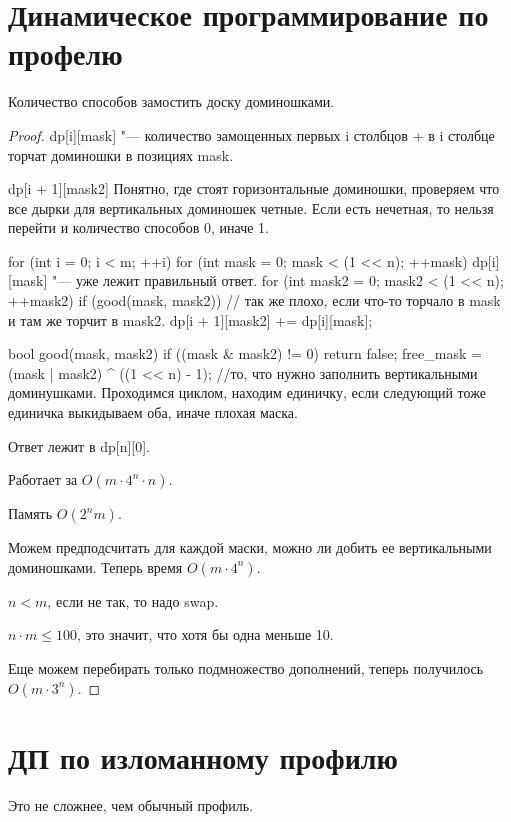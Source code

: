 \section{Динамическое программирование по профелю}
Количество способов замостить доску доминошками. 
\begin{proof}
dp[i][mask] "--- количество замощенных первых i столбцов + в i столбце торчат доминошки в позициях mask.

dp[i + 1][mask2] Понятно, где стоят горизонтальные доминошки, проверяем что все дырки для вертикальных доминошек четные. 
Если есть нечетная, то нельзя перейти и количество способов 0, иначе 1. 

\begin{cppcode}
for (int i = 0; i < m; ++i) {
    for (int mask = 0; mask < (1 << n); ++mask) {
        dp[i][mask] "--- уже лежит правильный ответ. 
        for (int mask2 = 0; mask2 < (1 << n); ++mask2) { 
            if (good(mask, mask2)) {// так же плохо, если что-то торчало в mask и там же торчит в mask2.
                dp[i + 1][mask2] += dp[i][mask];
            } 
        }
    }
}

bool good(mask, mask2) {
    if ((mask & mask2) != 0) return false;
    free_mask = (mask | mask2) ^ ((1 << n) - 1); //то, что нужно заполнить вертикальными доминушками.
    Проходимся циклом, находим единичку, если следующий тоже единичка выкидываем оба, иначе плохая маска.   
}
\end{cppcode}

Ответ лежит в dp[n][0].

Работает за $O(m \cdot 4^n \cdot n)$.

Память $O(2^n m)$.

Можем предподсчитать для каждой маски, можно ли добить ее вертикальными доминошками. 
Теперь время $O(m \cdot 4^n)$.

\begin{Rem}
$n < m$, если не так, то надо swap.

$n \cdot m \le 100$, это значит, что хотя бы одна меньше 10.
\end{Rem} 

Еще можем перебирать только подмножество дополнений, теперь получилось $O(m \cdot 3^{n})$.
\end{proof}
\section{ДП по изломанному профилю}
Это не сложнее, чем обычный профиль.

